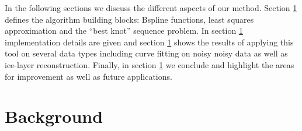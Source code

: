 \documentclass[a4paper,12pt]{article}
\begin{document}
   
   In the following sections we discuss the different aspects of our method. Section \ref{} defines 
   the algorithm building blocks: Bspline functions, 
   least squares approximation and the ``best knot'' sequence problem. 
   In section \ref{} implementation details are given and section 
   \ref{} shows the results of applying this tool on several data  types 
   including curve fitting on noisy noisy data as well as ice-layer reconstruction. 
   Finally,  in section \ref{}  we conclude and highlight the areas for improvement as well as future applications.
 
 
   \section{Background}
  





 
 
 

 
 
\end{document}
